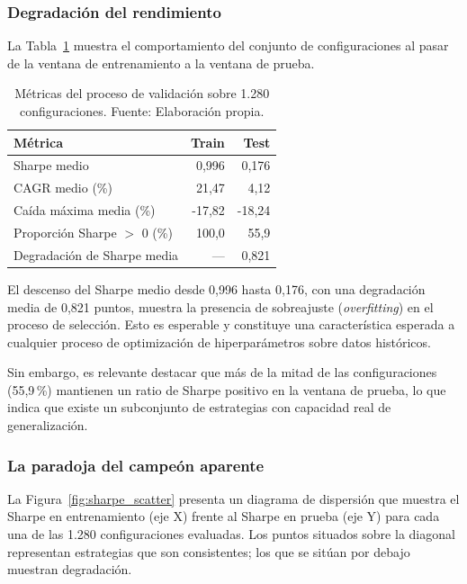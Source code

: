 \subsubsection{Degradación del rendimiento}

La Tabla~\ref{tab:degradacion} muestra el comportamiento del conjunto de configuraciones al pasar de la ventana
de entrenamiento a la ventana de prueba.

\begin{table}[H]
\centering
\begin{tabular}{lrr}
\toprule
\textbf{Métrica} & \textbf{Train} & \textbf{Test} \\
\midrule
Sharpe medio                & 0,996   & 0,176    \\
CAGR medio (\%)             & 21,47   & 4,12     \\
Caída máxima media (\%)     & -17,82  & -18,24   \\
Proporción Sharpe $>$ 0 (\%)& 100,0   & 55,9     \\
Degradación de Sharpe media & ---     & 0,821    \\
\bottomrule
\end{tabular}
\caption{Métricas del proceso de validación sobre
1.280 configuraciones. Fuente: Elaboración propia.}
\label{tab:degradacion}
\end{table}

El descenso del Sharpe medio desde 0,996 hasta 0,176, con una
degradación media de 0,821 puntos, muestra la presencia de
sobreajuste (\textit{overfitting}) en el proceso
de selección. Esto es esperable y constituye una
característica esperada a cualquier proceso de optimización de
hiperparámetros sobre datos históricos.

Sin embargo, es relevante destacar que más de la mitad de las
configuraciones (55,9\,\%) mantienen un ratio de Sharpe positivo
en la ventana de prueba, lo que indica que existe un subconjunto de
estrategias con capacidad real de generalización.

\subsubsection{La paradoja del campeón aparente}

La Figura~\ref{fig:sharpe_scatter} presenta un diagrama de
dispersión que muestra el Sharpe en entrenamiento (eje X)
frente al Sharpe en prueba (eje Y) para cada una de las 1.280
configuraciones evaluadas. Los puntos situados sobre la diagonal
representan estrategias que son consistentes; los que se
sitúan por debajo muestran degradación.

